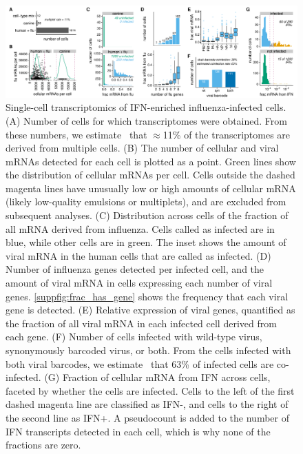 \documentclass[lineno]{asm-article}
\newcommand{\SUPPFIG}[1]{\autoref{suppfig:#1}}
\begin{document}
\begin{figure}
\begin{fullwidth}

\includegraphics[width=\linewidth, clip=false]{figures/single_cell_figures/p_cell_summary.pdf}

\caption{
Single-cell transcriptomics of IFN-enriched influenza-infected cells.
(A) 
Number of cells for which transcriptomes were obtained.
From these numbers, we estimate~\cite{bloom2018estimating} that $\approx$11\% of the transcriptomes are derived from multiple cells. 
(B) The number of cellular and viral mRNAs detected for each cell is plotted as a point.
Green lines show the distribution of cellular mRNAs per cell.
Cells outside the dashed magenta lines have unusually low or high amounts of cellular mRNA (likely low-quality emulsions or multiplets), and are excluded from subsequent analyses.
(C) Distribution across cells of the fraction of all mRNA derived from influenza.
Cells called as infected are in blue, while other cells are in green.
The inset shows the amount of viral mRNA in the human cells that are called as infected.
(D) Number of influenza genes detected per infected cell, and the amount of viral mRNA in cells expressing each number of viral genes.
\SUPPFIG{frac_has_gene} shows the frequency that each viral gene is detected.
(E) Relative expression of viral genes, quantified as the fraction of all viral mRNA in each infected cell derived from each gene.
(F) Number of cells infected with wild-type virus, synonymously barcoded virus, or both.
From the cells infected with both viral barcodes, we estimate~\cite{bloom2018estimating} that 63\% of infected cells are co-infected.
(G) Fraction of cellular mRNA from IFN across cells, faceted by whether the cells are infected.
Cells to the left of the first dashed magenta line are classified as IFN-, and cells to the right of the second line as IFN+.
A pseudocount is added to the number of IFN transcripts detected in each cell, which is why none of the fractions are zero.
}
\label{fig:transcriptomics}

\end{fullwidth}
\end{figure}
\end{document}
